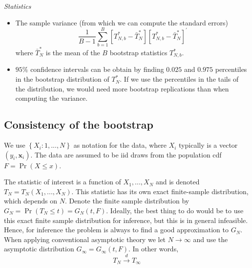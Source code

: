 \documentclass{article}
\begin{document}
\bigskip

\emph{Statistics}

\begin{itemize}
\item The sample variance (from which we can compute the standard errors)%
\begin{equation*}
\frac{1}{B-1}\sum_{b=1}^{B}\left[ T_{N,b}^{\ast }-\bar{T}_{N}^{\ast }\right] %
\left[ T_{N,b}^{\ast }-\bar{T}_{N}^{\ast }\right] ^{\prime }
\end{equation*}%
where $\bar{T}_{N}^{\ast }$ is the mean of the $B$ bootstrap statistics $%
T_{N,b}^{\ast }$.

\item $95\%$ confidence intervals can be obtain by finding $0.025$ and $%
0.975 $ percentiles in the bootstrap distribution of $T_{N}^{\ast }$. If we
use the percentiles in the tails of the distribution, we would need more
bootstrap replications than when computing the variance.
\end{itemize}

\subsection{Consistency of the bootstrap}

We use $\left\{ X_{i}:1,...,N\right\} $ as notation for the data, where $%
X_{i}$ typically is a vector $\left( y_{i},\mathbf{x}_{i}\right) $. The data
are assumed to be iid draws from the population cdf $F=\Pr \left( X\leq
x\right) $.

The statistic of interest is a function of $X_{1},...,X_{N}$ and is denoted $%
T_{N}=T_{N}\left( X_{1},...,X_{N}\right) $. This statistic has its own exact
finite-sample distribution, which depends on $N$. Denote the finite sample
distribution by $G_{N}=\Pr \left( T_{N}\leq t\right) =G_{N}\left( t,F\right) 
$. Ideally, the best thing to do would be to use this exact finite sample
distribution for inference, but this is in general infeasible. Hence, for
inference the problem is always to find a good approximation to $G_{N}$.
When applying conventional asymptotic theory we let $N\rightarrow \infty $
and use the asymptotic distribution $G_{\infty }=G_{\infty }\left(
t,F\right) $. In other words,%
\begin{equation*}
T_{N}\overset{d}{\rightarrow }T_{\infty }
\end{equation*}
\end{document}
